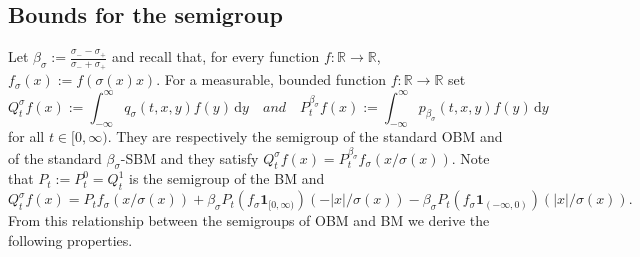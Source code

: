\documentclass[12pt]{article}
\numberwithin{equation}{section}
\theoremstyle{definition}
\theoremstyle{remark}
\newcommand{\RR}{\mathbb{R}}
\newcommand{\ind}[1]{\mathbf{1}_{#1}}
\newcommand{\vd}{\,\mathrm{d}}
\begin{document}
\subsection{Bounds for the semigroup}
Let ${\beta_\sigma}:=\frac{\sigma_--\sigma_+}{\sigma_-+\sigma_+}$ and recall that, for every function $f\colon \RR \to \RR$, $f_\sigma(x):=f(\sigma(x) x)$. 
For a measurable, bounded function $f\colon \RR \to \RR$ set 
\begin{equation}\label{eq:def:semig}
	Q^{\sigma}_t f(x) := \int_{-\infty}^{\infty} q_\sigma(t,x, y)f(y) \vd y
	\quad { and } \quad 
	P^{\beta_\sigma}_t f(x) := \int_{-\infty}^{\infty} p_{\beta_\sigma}(t,x, y)f(y) \vd y
\end{equation}
for all $t\in [0,\infty)$.
They are respectively the semigroup of the standard OBM and of the standard $\beta_\sigma$-SBM and they satisfy
$
	Q^{\sigma}_t f(x) = P^{{\beta_\sigma}}_t f_\sigma (x/\sigma(x)).
$
Note that $P_t:=P^0_t=Q_t^{1}$ is the semigroup of the BM and
\begin{equation} \label{eq:semig}
	Q^\sigma_t f(x) = P_t f_\sigma(x/\sigma(x))+ {\beta_\sigma} P_t (f_\sigma \ind{[0,\infty)})(-|x|/\sigma(x)) - {\beta_\sigma} P_t (f_\sigma \ind{(-\infty,0)}) (|x|/\sigma(x)).
\end{equation}
From this relationship between the semigroups of OBM and BM we derive the following properties.
%
%
\end{document}

